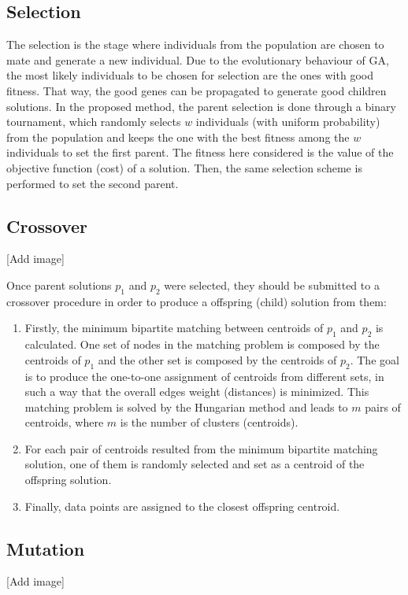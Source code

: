 \subsection{Selection}
The selection is the stage where individuals from the population are chosen to mate and generate a new individual. Due to the evolutionary behaviour of GA, the most likely individuals to be chosen for selection are the ones with good fitness. That way, the good genes can be propagated to generate good children solutions. In the proposed method, the parent selection is done through a binary tournament, which randomly selects $w$ individuals (with uniform probability) from the population and keeps the one with the best fitness among the $w$ individuals to set the first parent. The fitness here considered is the value of the objective function (cost) of a solution. Then, the same selection scheme is performed to set the second parent.

\subsection{Crossover}
[Add image]

Once parent solutions $p_1$ and $p_2$ were selected, they should be submitted to a crossover procedure in order to produce a offspring (child) solution from them:

\begin{enumerate}
	\item Firstly, the minimum bipartite matching between centroids of $p_1$ and $p_2$ is calculated. One set of nodes in the matching problem is composed by the centroids of $p_1$ and the other set is composed by the centroids of $p_2$. The goal is to produce the one-to-one assignment of centroids from different sets, in such a way that the overall edges weight (distances) is minimized. This matching problem is solved by the Hungarian method \cite{Kuhn1955} and leads to $m$ pairs of centroids, where $m$ is the number of clusters (centroids).

	\item For each pair of centroids resulted from the minimum bipartite matching solution, one of them is randomly selected and set as a centroid of the offspring solution.

	\item Finally, data points are assigned to the closest offspring centroid.
\end{enumerate}

\subsection{Mutation}
[Add image]

